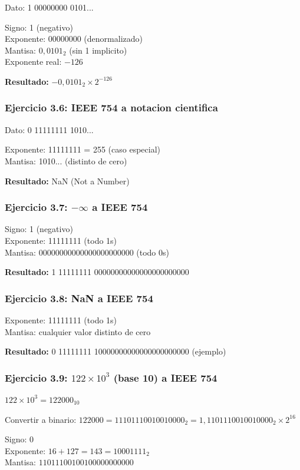 \documentclass[12pt,a4paper]{article}
\begin{document}
Dato: 1 00000000 0101...

Signo: 1 (negativo)\\
Exponente: 00000000 (denormalizado)\\
Mantisa: $0,0101_2$ (sin 1 implicito)\\
Exponente real: $-126$

\textbf{Resultado:} $-0,0101_2 \times 2^{-126}$

\subsubsection{Ejercicio 3.6: IEEE 754 a notacion cientifica}

Dato: 0 11111111 1010...

Exponente: 11111111 = 255 (caso especial)\\
Mantisa: 1010... (distinto de cero)

\textbf{Resultado:} NaN (Not a Number)

\subsubsection{Ejercicio 3.7: $-\infty$ a IEEE 754}

Signo: 1 (negativo)\\
Exponente: 11111111 (todo 1s)\\
Mantisa: 00000000000000000000000 (todo 0s)

\textbf{Resultado:} 1 11111111 00000000000000000000000

\subsubsection{Ejercicio 3.8: NaN a IEEE 754}

Exponente: 11111111 (todo 1s)\\
Mantisa: cualquier valor distinto de cero

\textbf{Resultado:} 0 11111111 10000000000000000000000 (ejemplo)

\subsubsection{Ejercicio 3.9: $122 \times 10^3$ (base 10) a IEEE 754}

$122 \times 10^3 = 122000_{10}$

Convertir a binario: $122000 = 11101110010010000_2 = 1,1101110010010000_2 \times 2^{16}$

Signo: 0\\
Exponente: $16 + 127 = 143 = 10001111_2$\\
Mantisa: $11011100100100000000000$
\end{document}
